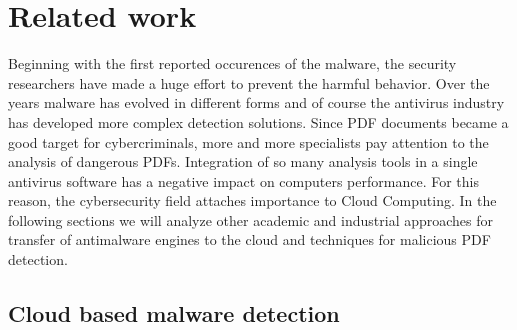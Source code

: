 \chapter{Related work}
\label{chapter:relatedWork}
Beginning with the first reported occurences of the malware, the security researchers have made a huge effort to prevent the harmful behavior. Over the years malware has evolved in different forms and of course the antivirus industry has developed more complex detection solutions. Since PDF documents became a good target for cybercriminals, more and more specialists pay attention to the analysis of dangerous PDFs. Integration of so many analysis tools in a single antivirus software has a negative impact on computers performance. For this reason, the cybersecurity field attaches importance to Cloud Computing. In the following sections we will analyze other academic and industrial approaches for transfer of antimalware engines to the cloud and techniques for malicious PDF detection.



\section{Cloud based malware detection}
\label{section:relatedWorkCloud}

